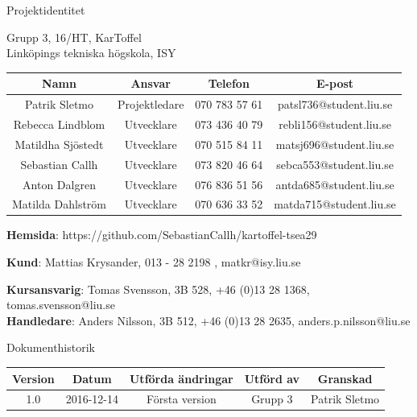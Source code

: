 \documentclass{article}
\begin{document}
\vspace*{\fill}
{
\sffamily
\centering
\large


{\huge
Projektidentitet
}

{\large
Grupp 3, 16/HT, KarToffel \\ Linköpings tekniska högskola, ISY
}

\vspace{0.5cm}

\begin{table}[H]
\centering
\begin{tabular}{ | c | c | c | c |}
\hline
Namn & Ansvar & Telefon & E-post \\
\hline
Patrik Sletmo & Projektledare & 070 783 57 61 & patsl736@student.liu.se \\
\hline
Rebecca Lindblom & Utvecklare & 073 436 40 79 & rebli156@student.liu.se \\
\hline
Matildha Sjöstedt & Utvecklare & 070 515 84 11 & matsj696@student.liu.se \\
\hline
Sebastian Callh & Utvecklare & 073 820 46 64 & sebca553@student.liu.se \\
\hline
Anton Dalgren & Utvecklare & 076 836 51 56 & antda685@student.liu.se \\
\hline
Matilda Dahlström & Utvecklare & 070 636 33 52 & matda715@student.liu.se \\
\hline
\end{tabular}
\end{table}
}

\begin{center}
\textbf{Hemsida}: https://github.com/SebastianCallh/kartoffel-tsea29
\end{center}

\begin{center}
\textbf{Kund}: Mattias Krysander, 013 - 28 2198 , matkr@isy.liu.se
\end{center}

\begin{center}
\textbf{Kursansvarig}: Tomas Svensson, 3B 528, +46 (0)13 28 1368, tomas.svensson@liu.se \\
\textbf{Handledare}: Anders Nilsson, 3B 512, +46 (0)13 28 2635, anders.p.nilsson@liu.se
\end{center}
\vspace*{\fill}
\clearpage

\renewcommand*\contentsname{Innehållsförteckning}
\tableofcontents
\clearpage


{
\sffamily
\centering
\large


{\huge 
Dokumenthistorik \\
}
\begin{table}[H]
\centering
\begin{tabular}{ | c | c | c | c | c |} 
\hline
\textbf{Version} & \textbf{Datum} & \textbf{Utförda ändringar} & \textbf{Utförd av } & \textbf{Granskad} \\
\hline
1.0 & 2016-12-14 & Första version & Grupp 3 & Patrik Sletmo \\
\hline

\end{tabular}
\end{table}
}
\end{document}
